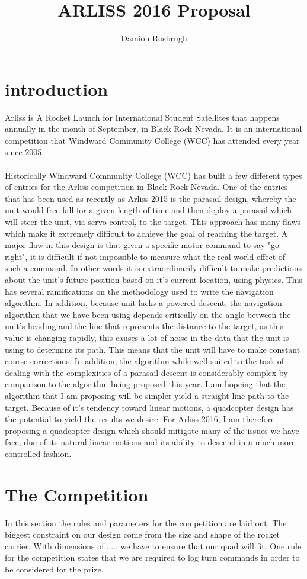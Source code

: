 \documentclass[10pt,a4paper]{article}
\title{ARLISS 2016 Proposal}
\author{Damion Rosbrugh}
\begin{document}
\section{introduction}
Arliss is A Rocket Launch for International Student Satellites that happens annually in the month of September, in Black Rock Nevada. It is an international competition that Windward Community College (WCC) has attended every year since 2005.\paragraph{}Historically Windward Community College (WCC) has built a few different types of entries for the Arliss competition in Black Rock Nevada. One of the entries that has been used as recently as Arliss 2015 is the parasail design, whereby the unit would free fall for a given length of time and then deploy a parasail which will steer the unit, via servo control, to the target. This approach has many flaws which make it extremely difficult to achieve the goal of reaching the target. A major flaw in this design is that given a specific motor command to say "go right", it is difficult if not impossible to measure what the real world effect of such a command. In other words it is extraordinarily difficult to make predictions about the unit's future position based on it's current location, using physics. This has several ramifications on the methodology used to write the navigation algorithm. In addition, because unit lacks a powered descent, the navigation algorithm that we have been using depends critically on the angle between the unit's heading and the line that represents the distance to the target, as this value is changing rapidly, this causes a lot of noise in the data that the unit is using to determine its path. This means that the unit will have to make constant course corrections. In addition, the algorithm while well suited to the task of dealing with the complexities of a parasail descent is considerably complex by comparison to the algorithm being proposed this year. I am hopeing that the algorithm that I am proposing will be simpler yield a straight line path to the target. Because of it's tendency toward linear motions, a quadcopter design has the potential to yield the results we desire. For Arliss 2016, I am therefore proposing a quadcopter design which should mitigate many of the issues we have face, due of its natural linear motions and its ability to descend in a much more controlled fashion.

\section{The Competition}
In this section the rules and parameters for the competition are laid out. The biggest constraint on our design come from the size and shape of the rocket carrier. With dimensions of...... we have to ensure that our quad will fit. One rule for the competition states that we are required to log turn commands in order to be considered for the prize.
\end{document}
